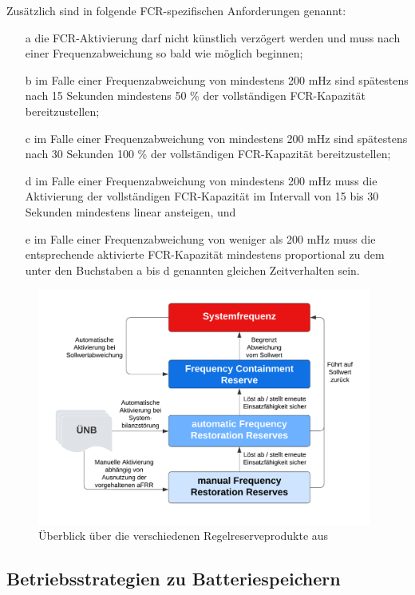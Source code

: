 Zusätzlich sind in \parencite[]{Verordnung} folgende FCR-spezifischen Anforderungen genannt:
\begin{itemize}
    \item [\glqq{} a] die FCR-Aktivierung darf nicht künstlich verzögert werden und muss nach einer Frequenzabweichung so bald wie möglich beginnen;
    \item [b] im Falle einer Frequenzabweichung von mindestens 200 mHz sind spätestens nach 15 Sekunden mindestens 50 \% der vollständigen FCR-Kapazität bereitzustellen;
    \item [c] im Falle einer Frequenzabweichung von mindestens 200 mHz sind spätestens nach 30 Sekunden 100 \% der vollständigen FCR-Kapazität bereitzustellen;
    \item [d] im Falle einer Frequenzabweichung von mindestens 200 mHz muss die Aktivierung der vollständigen FCR-Kapazität im Intervall von 15 bis 30 Sekunden mindestens linear ansteigen, und 
    \item [e] im Falle einer Frequenzabweichung von weniger als 200 mHz muss die entsprechende aktivierte FCR-Kapazität mindestens proportional zu dem unter den Buchstaben a bis d genannten gleichen Zeitverhalten sein.\grqq{}
\end{itemize}

\begin{figure}[h!]
    \centering
    \includegraphics[width=11cm]{Abbildungen/_Flussdiagramm (1).png}
    \caption{Überblick über die verschiedenen Regelreserveprodukte aus~\parencite{cronenberg_beschreibung_nodate}}\label{Fluss}
\end{figure}


\subsection{Betriebsstrategien zu Batteriespeichern}\label{Betriebsstrategien}

